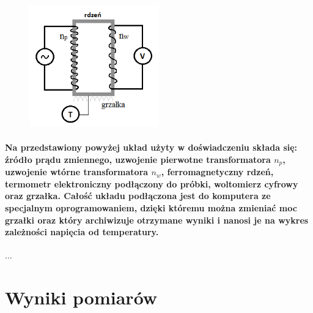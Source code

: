 \documentclass[a4paper,10pt]{article}
\begin{document}
\begin{figure}[H]
\center
\includegraphics[width=0.5\textwidth]{uklad.png}
\end{figure}

\paragraph{Na przedstawiony powyżej układ użyty w doświadczeniu składa się: źródło prądu zmiennego, uzwojenie pierwotne transformatora $n_p$, uzwojenie wtórne transformatora $n_w$, ferromagnetyczny rdzeń, termometr elektroniczny podłączony do próbki, woltomierz cyfrowy oraz grzałka. Całość układu podłączona jest do komputera ze specjalnym oprogramowaniem, dzięki któremu można zmieniać moc grzałki oraz który archiwizuje otrzymane wyniki i nanosi je na wykres zależności napięcia od temperatury.}...

\section{Wyniki pomiarów}
\end{document}
